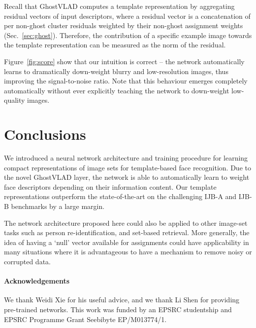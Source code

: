 \documentclass[runningheads]{llncs}
\begin{document}
Recall that GhostVLAD computes a template representation
by aggregating residual vectors of input descriptors,
where a residual vector is a concatenation of
per non-ghost cluster residuals
weighted by their non-ghost assignment weights (Sec.~\ref{sec:ghost}).
Therefore, the contribution of a specific example image towards
the template representation can be measured as the norm of the residual.

Figure~\ref{fig:score} show that our intuition is correct --
the network automatically learns to dramatically down-weight
blurry and low-resolution images, thus improving the signal-to-noise ratio.
Note that this behaviour emerges completely automatically
without ever explicitly teaching the network to down-weight low-quality
images.


\section{Conclusions}\label{sec:conclusion}
We introduced a neural network
architecture and training procedure
for learning compact representations of image sets
for template-based face recognition.
Due to the novel GhostVLAD layer, the network is able to
automatically learn to weight face descriptors
depending on their information content.
Our template representations outperform
the state-of-the-art on the challenging IJB-A and IJB-B benchmarks
by a large margin. 

The network architecture proposed here could also be applied to other
image-set tasks such as person re-identification, and set-based
retrieval. More generally, the idea of having a `null' vector available for
assignments could have applicability in many situations where it is advantageous to have 
a mechanism to remove noisy or corrupted data.


\paragraph{Acknowledgements}
We thank Weidi Xie for his useful advice, 
and we thank Li Shen for providing pre-trained
networks.
This work was funded by an EPSRC studentship and 
EPSRC Programme Grant Seebibyte EP/M013774/1.






\end{document}
